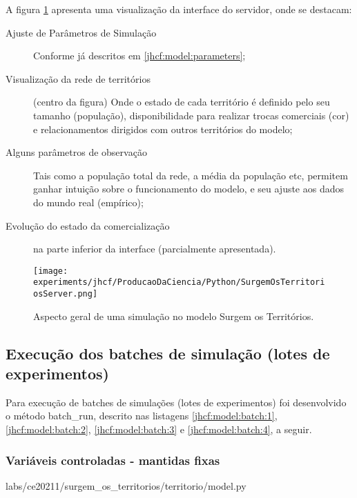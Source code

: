 A figura \ref{fig:SurgemOsTerritoriosServer} apresenta uma visualização da interface do servidor, onde se destacam:
\begin{description}
\item [Ajuste de Parâmetros de Simulação] Conforme já descritos em \ref{jhcf:model:parameters};
\item [Visualização da rede de territórios] (centro da figura) Onde o estado de cada território é definido pelo seu tamanho (população), disponibilidade para realizar trocas comerciais (cor) e relacionamentos dirigidos com outros territórios do modelo;
\item [Alguns parâmetros de observação] Tais como a população total da rede, a média da população etc, permitem ganhar intuição sobre o funcionamento do modelo, e seu ajuste aos dados do mundo real (empírico);
\item [Evolução do estado da comercialização] na parte inferior da interface (parcialmente apresentada).
\end{description}


\begin{figure}
    \centering
    \texttt{[image: experiments/jhcf/ProducaoDaCiencia/Python/SurgemOsTerritoriosServer.png]}
    \caption{Aspecto geral de uma simulação no modelo Surgem os Territórios.}
    \label{fig:SurgemOsTerritoriosServer}
\end{figure}


%

\subsection{Execução dos batches de simulação (lotes de experimentos)}

Para execução de batches de simulações (lotes de experimentos) foi desenvolvido o método batch\_run, descrito nas listagens \ref{jhcf:model:batch:1}, \ref{jhcf:model:batch:2}, \ref{jhcf:model:batch:3} e \ref{jhcf:model:batch:4}, a seguir.

\subsubsection{Variáveis controladas - mantidas fixas}


{labs/ce20211/surgem_os_territorios/territorio/model.py}

